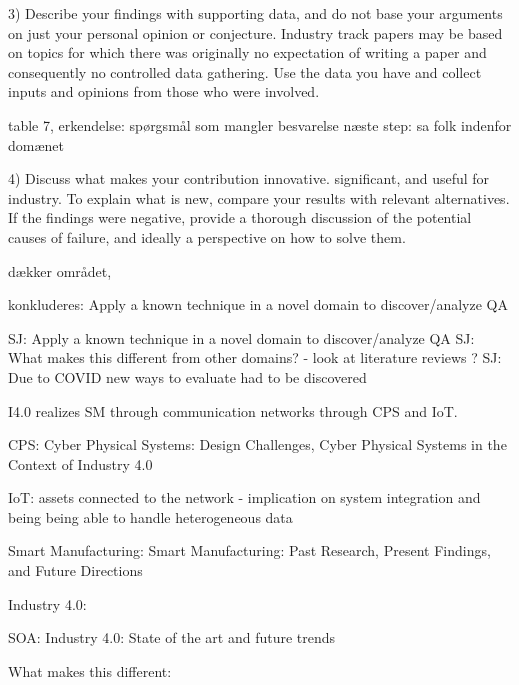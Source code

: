  
 3) Describe your findings with supporting data, and do not base your arguments on just your personal opinion or conjecture. Industry track papers may be based on topics for which there was originally no expectation of writing a paper and consequently no controlled data gathering. Use the data you have and collect inputs and opinions from those who were involved.
 
 table 7, 
 erkendelse: spørgsmål som mangler besvarelse
 næste step: sa folk indenfor domænet
 
 4) Discuss what makes your contribution innovative. significant, and useful for industry. To explain what is new, compare your results with relevant alternatives. If the findings were negative, provide a thorough discussion of the potential causes of failure, and ideally a perspective on how to solve them.
 
 dækker området, 
 
 konkluderes: Apply a known technique in a novel domain to discover/analyze QA
 
 SJ: Apply a known technique in a novel domain to discover/analyze QA 
 SJ: What makes this different from other domains? - look at literature reviews ?
 SJ: Due to COVID new ways to evaluate had to be discovered
 
 
 I4.0 realizes SM through communication networks through CPS and IoT. 
 
 
 CPS: Cyber Physical Systems: Design Challenges, Cyber Physical Systems in the Context of Industry 4.0
 
 IoT: assets connected to the network - implication on system integration and being being able to handle heterogeneous data
 
 Smart Manufacturing: Smart Manufacturing: Past Research, Present Findings, and Future Directions
 
 Industry 4.0: 
 
 SOA: Industry 4.0: State of the art and future trends
 
 What makes this different:  